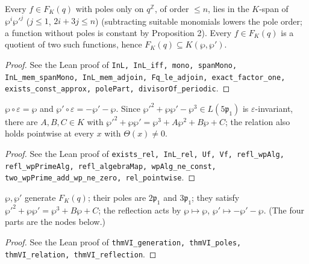 \begin{proposition}
\label{prop:wp-generation}
\leanok
Every $f\in F_K(q)$ with poles only on $q^{\mathbb Z}$, of order $\le n$, lies in the $K$-span of $\wp^i\wp'^j$ ($j\le1$, $2i+3j\le n$) (subtracting suitable monomials lowers the pole order; a function without poles is constant by Proposition 2). Every $f\in F_K(q)$ is a quotient of two such functions, hence $F_K(q)\subseteq K(\wp,\wp')$.
\end{proposition}
\begin{proof}
\leanok
See the Lean proof of \texttt{InL, InL\_iff, mono, spanMono, InL\_mem\_spanMono, InL\_mem\_adjoin, Fq\_le\_adjoin, exact\_factor\_one, exists\_const\_approx, polePart, divisorOf\_periodic}.
\end{proof}

\begin{proposition}
\label{prop:wp-structural-relation}
\leanok
$\wp\circ\varepsilon=\wp$ and $\wp'\circ\varepsilon=-\wp'-\wp$. Since $\wp'^2+\wp\wp'-\wp^3\in L(5\mathfrak p_1)$ is $\varepsilon$-invariant, there are $A,B,C\in K$ with $\wp'^2+\wp\wp'=\wp^3+A\wp^2+B\wp+C$; the relation also holds pointwise at every $x$ with $\Theta(x)\neq0$.
\end{proposition}
\begin{proof}
\leanok
See the Lean proof of \texttt{exists\_rel, InL\_rel, Uf, Vf, refl\_wpAlg, refl\_wpPrimeAlg, refl\_algebraMap, wpAlg\_ne\_const, two\_wpPrime\_add\_wp\_ne\_zero, rel\_pointwise}.
\end{proof}

\begin{theorem}[Theorem VI]
\label{thm:VI}
\leanok
$\wp,\wp'$ generate $F_K(q)$; their poles are $2\mathfrak p_1$ and $3\mathfrak p_1$; they satisfy $\wp'^2+\wp\wp'=\wp^3+B\wp+C$; the reflection acts by $\wp\mapsto\wp$, $\wp'\mapsto-\wp'-\wp$. (The four parts are the nodes below.)
\end{theorem}
\begin{proof}
\leanok
See the Lean proof of \texttt{thmVI\_generation, thmVI\_poles, thmVI\_relation, thmVI\_reflection}.
\end{proof}

